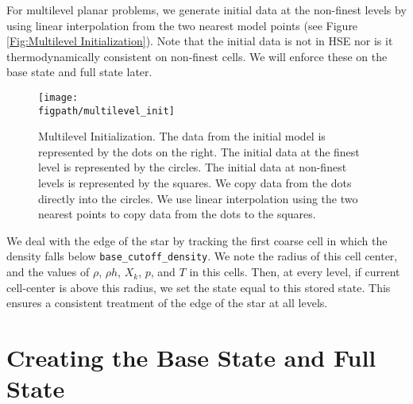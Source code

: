For multilevel planar problems, we generate
initial data at the non-finest levels by using linear interpolation
from the two nearest model points (see Figure \ref{Fig:Multilevel
  Initialization}).  Note that the initial data is not in HSE nor is
it thermodynamically consistent on non-finest cells.  We will enforce
these on the base state and full state later.
\begin{figure}[tpb]
\centering
\texttt{[image: \\figpath/multilevel\_init]}\hspace{0.2in}
\begin{minipage}[b]{5.0in}
\caption[Multi-level initial model initialization]
 {Multilevel Initialization.  The data from the initial model
  is represented by the dots on the right.  The initial data at the
  finest level is represented by the circles.  The initial data at
  non-finest levels is represented by the squares.  We copy data from
  the dots directly into the circles.  We use linear interpolation
  using the two nearest points to copy data from the dots to the
  squares.\vspace{2em}}
\end{minipage}
\label{Fig:Multilevel Initialization}
\end{figure}

We deal with the edge of the star by tracking the first coarse cell 
in which the density falls below {\tt base\_cutoff\_density}.  We note 
the radius of this cell center, and the values of $\rho$, $\rho h$, $X_k$, 
$p$, and $T$ in this cells.  Then, at every level, if current cell-center 
is above this radius, we set the state equal to this stored state.  This 
ensures a consistent treatment of the edge of the star at all levels.

\section{Creating the Base State and Full State}\label{Sec:Creating the Base State and Full State}

